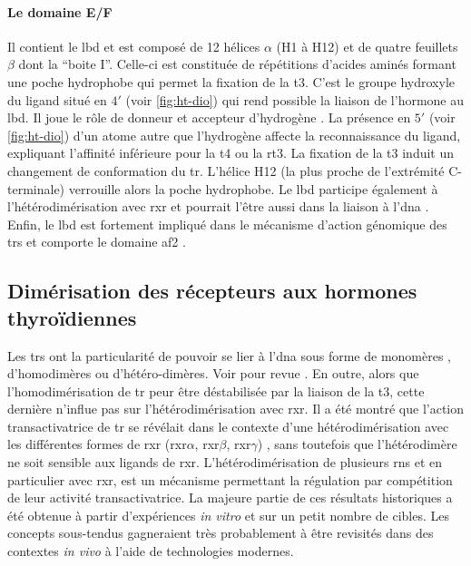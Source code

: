 \documentclass[../main.tex]{subfiles}
\begin{document}
		\paragraph{Le domaine E/F}
			Il contient le \gls{lbd} et est composé de 12 hélices $\alpha$ (H1 à H12) et de quatre feuillets $\beta$ dont la ``boite I''.
			Celle-ci est constituée de répétitions d'acides aminés formant une poche hydrophobe qui permet la fixation de la \gls{t3}.
			C'est le groupe hydroxyle du ligand situé en $4\prime$ (voir \autoref{fig:ht-dio}) qui rend possible la liaison de l'hormone au \gls{lbd}.
			Il joue le rôle de donneur et accepteur d’hydrogène \citep{Dietrich1977}.
			La présence en $5\prime$ (voir \autoref{fig:ht-dio}) d'un atome autre que l'hydrogène affecte la reconnaissance du ligand, expliquant l'affinité inférieure pour la \gls{t4} ou la \gls{rt3}.
			La fixation de la \gls{t3} induit un changement de conformation du \gls{tr}.
			L'hélice H12 (la plus proche de l'extrémité C-terminale) verrouille alors la poche hydrophobe.
			Le \gls{lbd} participe également à l'hétérodimérisation avec \gls{rxr} \citep{Wagner1995,Bain2007} et pourrait l'être aussi dans la liaison à l'\gls{dna} \citep{Figueira2010}.
			Enfin, le \gls{lbd} est fortement impliqué dans le mécanisme d'action génomique des \glspl{tr} et comporte le domaine \gls{af2} \citep{Barettino1994,Tone1994}.


	\subsection{Dimérisation des récepteurs aux hormones thyroïdiennes}
		Les \glspl{tr} ont la particularité de pouvoir se lier à l'\gls{dna} sous forme de monomères \citep{Schrader1994}, d'homodimères ou d'hétéro-dimères. Voir pour revue \citet{Ikeda1994}.
		En outre, alors que l'homodimérisation de \gls{tr} peur être déstabilisée par la liaison de la \gls{t3}, cette dernière n'influe pas sur l'hétérodimérisation avec \gls{rxr}.
		Il a été montré que l'action transactivatrice de \gls{tr} se révélait dans le contexte d'une hétérodimérisation avec les différentes formes de \gls{rxr} (\gls{rxr}$\alpha$, \gls{rxr}$\beta$, \gls{rxr}$\gamma$) \citep{Umesono1988a,Mangelsdorf1990,Kliewer1992,Zhang1992}, sans toutefois que l'hétérodimère ne soit sensible aux ligands de \gls{rxr}.
		L'hétérodimérisation de plusieurs \glspl{rn} et en particulier avec \gls{rxr}, est un mécanisme permettant la régulation par compétition de leur activité transactivatrice.
		La majeure partie de ces résultats historiques a été obtenue à partir d'expériences \textit{in vitro} et sur un petit nombre de cibles.
		Les concepts sous-tendus gagneraient très probablement à être revisités dans des contextes \textit{in vivo} à l'aide de technologies modernes.
\end{document}
